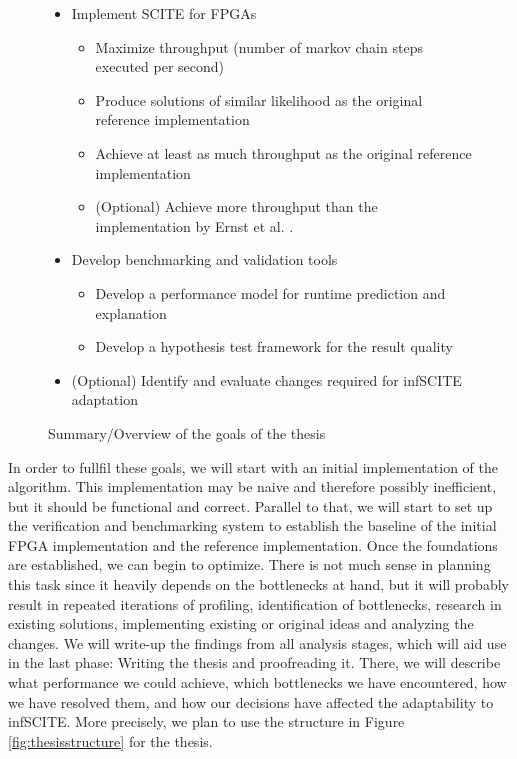 \begin{figure}
    \begin{itemize}
        \item Implement \ac{SCITE} for \acp{FPGA}
        \begin{itemize}
            \item Maximize throughput (number of markov chain steps executed per second)
            \item Produce solutions of similar likelihood as the original reference implementation
            \item Achieve at least as much throughput as the original reference implementation
            \item (Optional) Achieve more throughput than the implementation by Ernst et al. \cite{ernst2020Performance}.
        \end{itemize}
        \item Develop benchmarking and validation tools
        \begin{itemize}
            \item Develop a performance model for runtime prediction and explanation
            \item Develop a hypothesis test framework for the result quality
        \end{itemize}
        \item (Optional) Identify and evaluate changes required for \ac{infSCITE} adaptation
    \end{itemize}

    \centering
    \caption{Summary/Overview of the goals of the thesis}
    \label{fig:goals}
\end{figure}

In order to fullfil these goals, we will start with an initial implementation of the algorithm. This implementation may be naive and therefore possibly inefficient, but it should be functional and correct. Parallel to that, we will start to set up the verification and benchmarking system to establish the baseline of the initial FPGA implementation and the reference implementation. Once the foundations are established, we can begin to optimize. There is not much sense in planning this task since it heavily depends on the bottlenecks at hand, but it will probably result in repeated iterations of profiling, identification of bottlenecks, research in existing solutions, implementing existing or original ideas and analyzing the changes. We will write-up the findings from all analysis stages, which will aid use in the last phase: Writing the thesis and proofreading it. There, we will describe what performance we could achieve, which bottlenecks we have encountered, how we have resolved them, and how our decisions have affected the adaptability to \ac{infSCITE}. More precisely, we plan to use the structure in Figure \ref{fig:thesisstructure} for the thesis.

